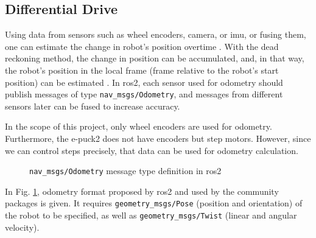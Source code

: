 \subsection{Differential Drive}
\label{sec:simulation:odometry_velocity}

Using data from sensors such as wheel encoders, camera, or \ac{imu}, or fusing them, one can estimate the change in robot's position overtime \cite{shen_localization_2011, nister_visual_2004}.
With the dead reckoning method, the change in position can be accumulated, and, in that way, the robot's position in the local frame (frame relative to the robot's start position) can be estimated \cite{ben-ari_elements_2018, astolfi_exponential_1999}.
In \ac{ros2}, each sensor used for odometry should publish messages of type \texttt{nav\_msgs/Odometry}, and messages from different sensors later can be fused to increase accuracy. 

In the scope of this project, only wheel encoders are used for odometry.
Furthermore, the e-puck2 does not have encoders but step motors.
However, since we can control steps precisely, that data can be used for odometry calculation.

\begin{figure}[H]
    \centering
    \begin{subfigure}[b]{0.9\textwidth}
    \end{subfigure}
    \caption{\texttt{nav\_msgs/Odometry} message type definition in \ac{ros2}}
    \label{fig:simulation:odometry}
\end{figure}

In Fig. \ref{fig:simulation:odometry}, odometry format proposed by \ac{ros2} and used by the community packages is given. It requires \texttt{geometry\_msgs/Pose} (position and orientation) of the robot to be specified, as well as \texttt{geometry\_msgs/Twist} (linear and angular velocity).

